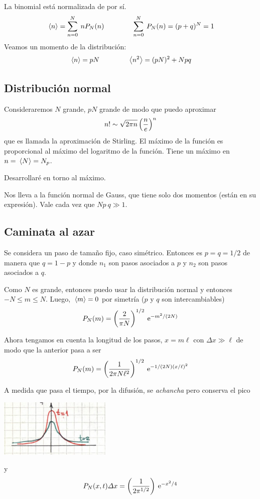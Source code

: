 \documentclass[10pt,oneside]{CBFT_book}
\begin{document}
La binomial está normalizada de por sí.
\[
	\:\left\langle n \right\rangle = \sum_{n=0}^N \: n P_N(n) \qquad \qquad 
	\sum_{n=0}^N \: P_N(n) = ( p + q )^N = 1
\]
Veamos un momento de la distribución:
\[
	\:\left\langle n \right\rangle = p N \qquad \qquad  \:\left\langle n^2 \right\rangle = (p N)^2 + N p q
\]

\subsection{Distribución normal}

Consideraremos $N$ grande, $pN$ grande de modo que puedo aproximar 
\[
	n! \sim \sqrt{2\pi n} \left( \frac{ n }{ e } \right)^n
\]
que es llamada la aproximación de Stirling.
El máximo de la función es proporcional al máximo del logaritmo de la función.
Tiene un máximo en $n = \:\left\langle N \right\rangle = N_p$.

Desarrollaré en torno al máximo.

Nos lleva a la función normal de Gauss, que tiene solo dos momentos (están en su
expresión). Vale cada vez que $N p \: q \gg 1$.

\subsection{Caminata al azar}

Se considera un paso de tamaño fijo, caso simétrico. Entonces es $p=q=1/2$ de manera que $q=1-p$
y donde $n_1$ son pasos asociados a $p$ y $n_2$ son pasos asociados a $q$.

Como $N$ es grande, entonces puedo usar la distribución normal y entonces $-N \leq m \leq N$.
Luego, $ \:\left\langle m \right\rangle = 0 $ por simetría ($p$ y $q$ son intercambiables)
\[
	P_N(m) = \left( \frac{ 2 }{ \pi N } \right)^{1/2} \:\mathrm{e}^{- m^2/(2N)}
\]

Ahora tengamos en cuenta la longitud de los pasos, $x = m \ell$ con $\Delta x \gg \ell$ de modo que
la anterior pasa a ser
\[
	P_N(m) = \left( \frac{ 1 }{ 2 \pi N \ell^2  } \right)^{1/2} \:\mathrm{e}^{- 1/(2N) (x/\ell)^2}
\]

A medida que pasa el tiempo, por la difusión, se {\it achancha} pero conserva el pico

\includegraphics[width=0.40\textwidth]{images/1606329120.jpg}

y
\[
	P_N(x,t) \Delta x = \left( \frac{ 1 }{ 2 \pi^{1/2} } \right) \:\mathrm{e}^{-x^2/4}
\]
\end{document}

